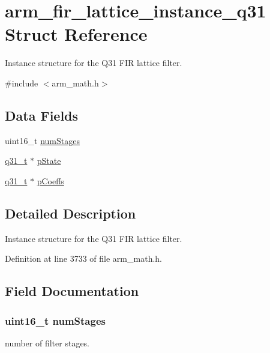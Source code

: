 \hypertarget{structarm__fir__lattice__instance__q31}{}\section{arm\+\_\+fir\+\_\+lattice\+\_\+instance\+\_\+q31 Struct Reference}
\label{structarm__fir__lattice__instance__q31}


Instance structure for the Q31 F\+IR lattice filter.  




{\ttfamily \#include $<$arm\+\_\+math.\+h$>$}

\subsection*{Data Fields}
\begin{DoxyCompactItemize}
\item 
uint16\+\_\+t \hyperlink{structarm__fir__lattice__instance__q31_a4cceb90547b3e585d4c7aabaa8057212}{num\+Stages}
\item 
\hyperlink{arm__math_8h_adc89a3547f5324b7b3b95adec3806bc0}{q31\+\_\+t} $\ast$ \hyperlink{structarm__fir__lattice__instance__q31_adee4ba3ee8869865af7d8fa08ca913d6}{p\+State}
\item 
\hyperlink{arm__math_8h_adc89a3547f5324b7b3b95adec3806bc0}{q31\+\_\+t} $\ast$ \hyperlink{structarm__fir__lattice__instance__q31_a68888e36167d81cb7836db10367a1682}{p\+Coeffs}
\end{DoxyCompactItemize}


\subsection{Detailed Description}
Instance structure for the Q31 F\+IR lattice filter. 

Definition at line 3733 of file arm\+\_\+math.\+h.



\subsection{Field Documentation}
\subsubsection[{\texorpdfstring{num\+Stages}{numStages}}]{\setlength{\rightskip}{0pt plus 5cm}uint16\+\_\+t num\+Stages}\hypertarget{structarm__fir__lattice__instance__q31_a4cceb90547b3e585d4c7aabaa8057212}{}\label{structarm__fir__lattice__instance__q31_a4cceb90547b3e585d4c7aabaa8057212}
number of filter stages. 

